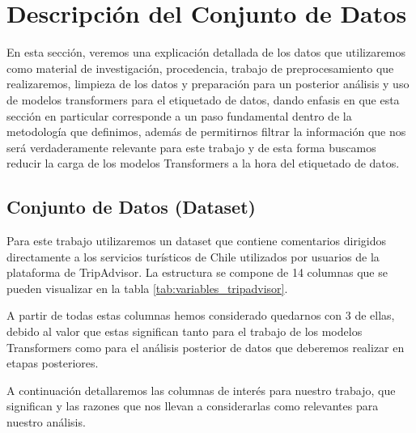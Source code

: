 \chapter{Descripción del Conjunto de Datos}
\label{cha:Descripción del Conjunto de Datos}

En esta sección, veremos una explicación detallada de los datos que utilizaremos como material de investigación, procedencia, trabajo de preprocesamiento que realizaremos, limpieza de los datos y preparación para un posterior análisis y uso de modelos transformers para el etiquetado de datos, dando enfasis en que esta sección en particular corresponde a un paso fundamental dentro de la metodología que definimos, además de permitirnos filtrar la información que nos será verdaderamente relevante para este trabajo y de esta forma buscamos reducir la carga de los modelos Transformers a la hora del etiquetado de datos.

\section{\textbf{Conjunto de Datos (Dataset)}}
Para este trabajo utilizaremos un dataset que contiene comentarios dirigidos directamente a los servicios turísticos de Chile utilizados por usuarios de la plataforma de TripAdvisor. La estructura se compone de 14 columnas que se pueden visualizar en la tabla \ref{tab:variables_tripadvisor}.

A partir de todas estas columnas hemos considerado quedarnos con 3 de ellas, debido al valor que estas significan tanto para el trabajo de los modelos Transformers como para el análisis posterior de datos que deberemos realizar en etapas posteriores.

A continuación detallaremos las columnas de interés para nuestro trabajo, que significan y las razones que nos llevan a considerarlas como relevantes para nuestro análisis.

